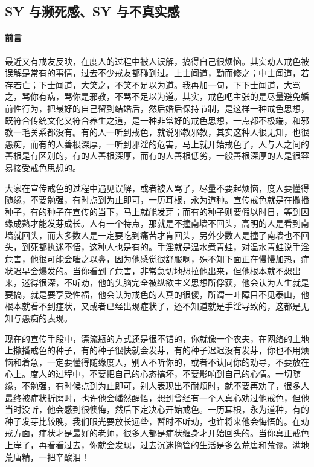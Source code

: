 \subsection{SY 与濒死感、SY 与不真实感}

\paragraph*{前言}

最近又有戒友反映，在度人的过程中被人误解，搞得自己很烦恼。其实劝人戒色被误解是常有的事情，过去不少戒友都碰到过。上士闻道，勤而修之；中士闻道，若存若亡；下士闻道，大笑之，不笑不足以为道。我再加一句，下下士闻道，大骂之，骂你有病，骂你是邪教，不骂不足以为道。其实，戒色吧主张的是尽量避免婚前性行为，把最好的自己留到结婚后，然后婚后保持节制，是这样一种戒色思想，既符合传统文化又符合养生之道，是一种非常好的戒色思想，一点都不极端，和邪教一毛关系都没有。有的人一听到戒色，就说邪教邪教，其实这种人很无知，也很愚痴，而有的人善根深厚，一听到邪淫的危害，马上就开始戒色了，人与人之间的善根是有区别的，有的人善根深厚，而有的人善根低劣，一般善根深厚的人是很容易接受戒色思想的。

大家在宣传戒色的过程中遇见误解，或者被人骂了，尽量不要起烦恼，度人要懂得随缘，不要勉强，有时点到为止即可，一历耳根，永为道种。宣传戒色就是在撒播种子，有的种子在宣传的当下，马上就能发芽；而有的种子则要假以时日，等到因缘成熟才能发芽成长。人有一个特点，那就是不撞南墙不回头，高明的人是看到南墙就回头，而大多数人是一定要吃到痛苦才肯回头，另外少数人是撞了南墙也不回头，到死都执迷不悟，这种人也是有的。手淫就是温水煮青蛙，对温水青蛙说手淫危害，他很可能会嗤之以鼻，因为他感觉很舒服啊，殊不知下面正在慢慢加热，症状迟早会爆发的。当你看到了危害，非常急切地想拉他出来，但他根本就不想出来，迷得很深，不听劝，他的头脑完全被纵欲主义思想所俘获，他会认为人生就是要搞，就是要享受性福，他会认为戒色的人真的很傻，所谓一叶障目不见泰山，他根本就看不到症状，又或者已经出现症状了，还不知道就是手淫导致的，这都是无知与愚痴的表现。

现在的宣传手段中，漂流瓶的方式还是很不错的，你就像一个农夫，在网络的土地上撒播戒色的种子，有的种子很快就会发芽，有的种子迟迟没有发芽，你也不用烦恼和着急，一定要懂得随缘度人，别人不听你的，或者不认同你的劝导，不要放在心上。度人的过程中，不要把自己的心态搞坏，不要影响到自己的心情。一切随缘，不勉强，有时候点到为止即可，别人表现出不耐烦时，就不要再劝了，很多人最终被症状折磨时，也许他会幡然醒悟，想到曾经有一个人真心劝过他戒色，但他当时没听，他会感到很懊悔，然后下定决心开始戒色。一历耳根，永为道种，有的种子发芽比较晚，我们眼光要放长远些，暂时不听劝，也许将来他会悔悟的。在劝戒方面，症状才是最好的老师，很多人都是症状缠身才开始回头的。当你真正戒色上岸了，再看看过去，你就会发现，过去沉迷撸管的生活是多么荒唐和荒谬。满地荒唐精，一把辛酸泪！

